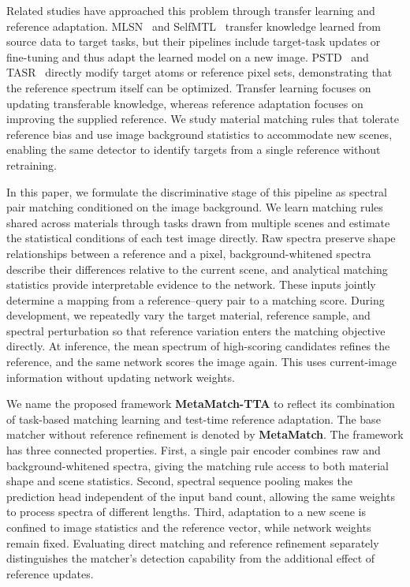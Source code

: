 \documentclass[a4paper,11pt]{article}
\newcommand{\method}{\textbf{MetaMatch-TTA}}
\newcommand{\matcher}{\textbf{MetaMatch}}
\begin{document}
Related studies have approached this problem through transfer learning and reference adaptation. MLSN~\cite{mlsn} and SelfMTL~\cite{selfmtl} transfer knowledge learned from source data to target tasks, but their pipelines include target-task updates or fine-tuning and thus adapt the learned model on a new image. PSTD~\cite{pstd} and TASR~\cite{tasr} directly modify target atoms or reference pixel sets, demonstrating that the reference spectrum itself can be optimized. Transfer learning focuses on updating transferable knowledge, whereas reference adaptation focuses on improving the supplied reference. We study material matching rules that tolerate reference bias and use image background statistics to accommodate new scenes, enabling the same detector to identify targets from a single reference without retraining.

In this paper, we formulate the discriminative stage of this pipeline as spectral pair matching conditioned on the image background. We learn matching rules shared across materials through tasks drawn from multiple scenes and estimate the statistical conditions of each test image directly. Raw spectra preserve shape relationships between a reference and a pixel, background-whitened spectra describe their differences relative to the current scene, and analytical matching statistics provide interpretable evidence to the network. These inputs jointly determine a mapping from a reference--query pair to a matching score. During development, we repeatedly vary the target material, reference sample, and spectral perturbation so that reference variation enters the matching objective directly. At inference, the mean spectrum of high-scoring candidates refines the reference, and the same network scores the image again. This uses current-image information without updating network weights.

We name the proposed framework \method{} to reflect its combination of task-based matching learning and test-time reference adaptation. The base matcher without reference refinement is denoted by \matcher{}. The framework has three connected properties. First, a single pair encoder combines raw and background-whitened spectra, giving the matching rule access to both material shape and scene statistics. Second, spectral sequence pooling makes the prediction head independent of the input band count, allowing the same weights to process spectra of different lengths. Third, adaptation to a new scene is confined to image statistics and the reference vector, while network weights remain fixed. Evaluating direct matching and reference refinement separately distinguishes the matcher's detection capability from the additional effect of reference updates.
\end{document}
